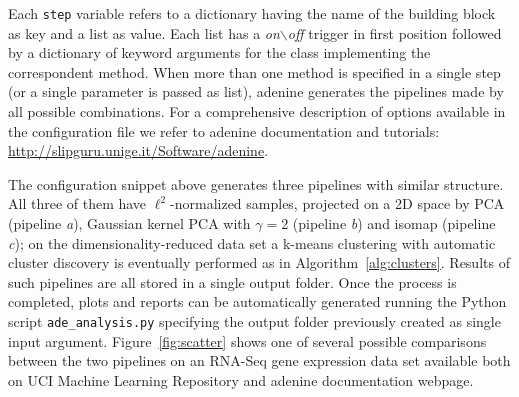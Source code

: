 \documentclass[twoside,11pt]{article}
\makeatletter
\newcommand{\ade}{{\sc adenine}\@\xspace}
\newcommand{\py}{{Python}\@\xspace}
\makeatother
\begin{document}
\noindent Each \texttt{step} variable refers to a dictionary having the name of the building block as key and a {list} as value. Each list has a \emph{on$\backslash$off} trigger in first position followed by a dictionary of keyword arguments for the class implementing the correspondent method. When more than one method is specified in a single step (or a single parameter is passed as {list}), \ade generates the pipelines made by all possible combinations.
For a comprehensive description of options available in the configuration file we refer to \ade documentation and tutorials: {\small\url{http://slipguru.unige.it/Software/adenine}}.

The configuration snippet above generates three pipelines with similar structure. All three of them have $\ell^2$-normalized samples, projected on a 2D space by PCA (pipeline \textit{a}), Gaussian kernel PCA with $\gamma=2$ (pipeline \textit{b}) and isomap (pipeline \textit{c}); on the dimensionality-reduced data set a k-means clustering with automatic cluster discovery is eventually performed as in Algorithm~\ref{alg:clusters}.
Results of such pipelines are all stored in a single output folder. Once the process is completed, plots and reports can be automatically generated running the \py script \texttt{ade\_analysis.py} specifying the output folder previously created as single input argument. Figure~\ref{fig:scatter} shows one of several possible comparisons between the two pipelines on an RNA-Seq gene expression data set available both on UCI Machine Learning Repository and
\ade documentation webpage.
\end{document}
